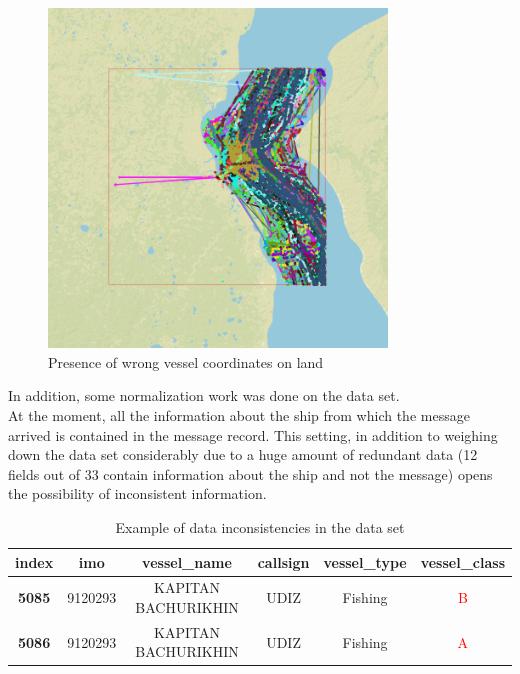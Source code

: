 \begin{itemize}
\begin{minipage}{\linewidth}
\begin{lstlisting}[language=Python]
        \end{lstlisting}
        
        \begin{figure}[H]
            \centering
            \includegraphics[width=9cm]{Images/2/land-points.png}
            \caption{Presence of wrong vessel coordinates on land}
        \end{figure}
        
        \end{minipage}
        
    \end{itemize}

        
    In addition, some normalization work was done on the data set.
    \\
    At the moment, all the information about the ship from which the message arrived is contained in the message record. This setting, in addition to weighing down the data set considerably due to a huge amount of redundant data (12 fields out of 33 contain information about the ship and not the message) opens the possibility of inconsistent information.
    \\
    
    \begin{table}[H]
    \begin{tabular}{|c|c|c|c|c|c|}
        \hline
            \textbf{index} & \textbf{imo} & \textbf{vessel\_name} & \textbf{callsign} & \textbf{vessel\_type} & \textbf{vessel\_class} \\
        \hline
            \textbf{5085} & 9120293      & KAPITAN BACHURIKHIN   & UDIZ              & Fishing               & \textcolor{red}{B}      \\
            \textbf{5086} & 9120293      & KAPITAN BACHURIKHIN   & UDIZ              & Fishing               & \textcolor{red}{A}      \\
        \hline
    \end{tabular}
    \caption{Example of data inconsistencies in the data set}
    \end{table}
    \\
    
